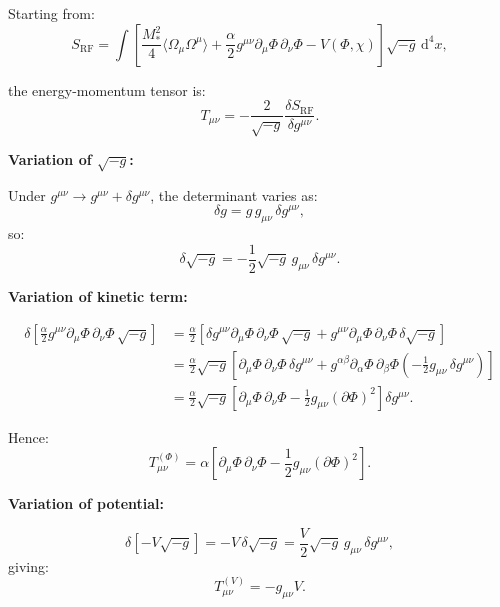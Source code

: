 \documentclass[11pt,a4paper]{article}
\numberwithin{equation}{section}
\theoremstyle{plain}
\theoremstyle{definition}
\theoremstyle{remark}
\newcommand{\dd}{\mathrm{d}}
\begin{document}
Starting from:
\begin{equation}
S_{\mathrm{RF}} = \int \left[\frac{M_*^2}{4}\langle \Omega_\mu \Omega^\mu \rangle + \frac{\alpha}{2}g^{\mu\nu}\partial_\mu\Phi\,\partial_\nu\Phi - V(\Phi,\chi)\right] \sqrt{-g}\, \dd^4x,
\end{equation}

the energy-momentum tensor is:
\begin{equation}
T_{\mu\nu} = -\frac{2}{\sqrt{-g}}\frac{\delta S_{\mathrm{RF}}}{\delta g^{\mu\nu}}.
\end{equation}

\textbf{Variation of $\sqrt{-g}$:}

Under $g^{\mu\nu} \to g^{\mu\nu} + \delta g^{\mu\nu}$, the determinant varies as:
\begin{equation}
\delta g = g\,g_{\mu\nu}\,\delta g^{\mu\nu},
\end{equation}
so:
\begin{equation}
\delta\sqrt{-g} = -\frac{1}{2}\sqrt{-g}\,g_{\mu\nu}\,\delta g^{\mu\nu}.
\end{equation}

\textbf{Variation of kinetic term:}

\begin{align}
\delta\left[\frac{\alpha}{2}g^{\mu\nu}\partial_\mu\Phi\,\partial_\nu\Phi\,\sqrt{-g}\right] &= \frac{\alpha}{2}\left[\delta g^{\mu\nu}\partial_\mu\Phi\,\partial_\nu\Phi\,\sqrt{-g} + g^{\mu\nu}\partial_\mu\Phi\,\partial_\nu\Phi\,\delta\sqrt{-g}\right]\\
&= \frac{\alpha}{2}\sqrt{-g}\left[\partial_\mu\Phi\,\partial_\nu\Phi\,\delta g^{\mu\nu} + g^{\alpha\beta}\partial_\alpha\Phi\,\partial_\beta\Phi\left(-\frac{1}{2}g_{\mu\nu}\,\delta g^{\mu\nu}\right)\right]\\
&= \frac{\alpha}{2}\sqrt{-g}\left[\partial_\mu\Phi\,\partial_\nu\Phi - \frac{1}{2}g_{\mu\nu}(\partial\Phi)^2\right]\delta g^{\mu\nu}.
\end{align}

Hence:
\begin{equation}
T_{\mu\nu}^{(\Phi)} = \alpha\left[\partial_\mu\Phi\,\partial_\nu\Phi - \frac{1}{2}g_{\mu\nu}(\partial\Phi)^2\right].
\end{equation}

\textbf{Variation of potential:}

\begin{equation}
\delta\left[-V\sqrt{-g}\right] = -V\,\delta\sqrt{-g} = \frac{V}{2}\sqrt{-g}\,g_{\mu\nu}\,\delta g^{\mu\nu},
\end{equation}
giving:
\begin{equation}
T_{\mu\nu}^{(V)} = -g_{\mu\nu}V.
\end{equation}
\end{document}
